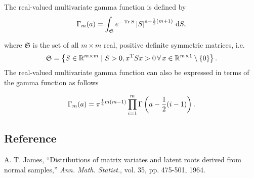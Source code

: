 \documentclass[12pt]{article}
\DeclareMathOperator{\Tr}{Tr}
\begin{document}
The real-valued multivariate gamma function is defined by
\begin{equation}
\Gamma_m(a) = \int_{\mathfrak{S}} e^{-\Tr S} \left|S\right|^{a-{1 \over 2}(m+1)}\, {\rm d} S,
\end{equation}

where $\mathfrak{S}$ is the set of all $m \times m$ real, positive definite symmetric matrices, i.e.
\begin{equation}
\mathfrak{S} = \left\{S \in \Bbb{R}^{m \times m} \mid S > 0, x^{\rm T}Sx > 0\, \forall\, x \in \mathbb{R}^{m \times 1}\setminus\{ 0\}\right\}.
\end{equation}
The real-valued multivariate gamma function can also be expressed in terms of the gamma function as follows

\begin{equation}
\Gamma_m(a) = \pi^{{1 \over 4} m (m-1)} \prod\limits_{i=1}^{m}\Gamma\left(a-{1 \over 2}(i-1)\right).
\end{equation}

\subsection*{Reference}
A. T. James, ``Distributions of matrix variates and latent roots derived from normal samples,'' {\it Ann. Math. Statist.}, vol. 35, pp. 475-501, 1964.
\end{document}
